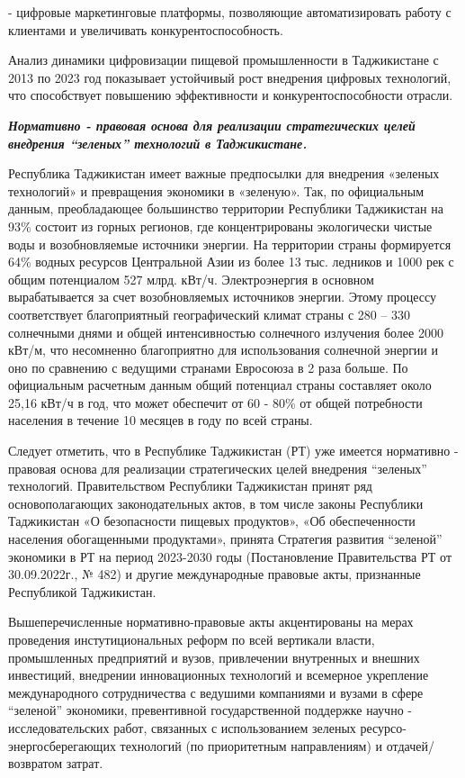 \begin{multicols}{2}
- цифровые маркетинговые платформы, позволяющие автоматизировать работу
с клиентами и увеличивать конкурентоспособность.

Анализ динамики цифровизации пищевой промышленности в Таджикистане с
2013 по 2023 год показывает устойчивый рост внедрения цифровых
технологий, что способствует повышению эффективности и
конкурентоспособности отрасли.

\emph{{\bfseries Нормативно - правовая основа для реализации стратегических
целей внедрения ``зеленых'' технологий в Таджикистане.}}

Республика Таджикистан имеет важные предпосылки для внедрения «зеленых
технологий» и превращения экономики в «зеленую». Так, по официальным
данным, преобладающее большинство территории Республики Таджикистан на
93\% состоит из горных регионов, где концентрированы экологически чистые
воды и возобновляемые источники энергии. На территории страны
формируется 64\% водных ресурсов Центральной Азии из более 13 тыс.
ледников и 1000 рек с общим потенциалом 527 млрд. кВт/ч. Электроэнергия
в основном вырабатывается за счет возобновляемых источников энергии.
Этому процессу соответствует благоприятный географический климат страны
с 280 -- 330 солнечными днями и общей интенсивностью солнечного
излучения более 2000 кВт/м, что несомненно благоприятно для
использования солнечной энергии и оно по сравнению с ведущими странами
Евросоюза в 2 раза больше. По официальным расчетным данным общий
потенциал страны составляет около 25,16 кВт/ч в год, что может обеспечит
от 60 - 80\% от общей потребности населения в течение 10 месяцев в году
по всей страны.

Следует отметить, что в Республике Таджикистан (РТ) уже имеется
нормативно - правовая основа для реализации стратегических целей
внедрения ``зеленых'' технологий. Правительством Республики Таджикистан
принят ряд основополагающих законодательных актов, в том числе законы
Республики Таджикистан «О безопасности пищевых продуктов», «Об
обеспеченности населения обогащенными продуктами», принята Стратегия
развития ``зеленой'' экономики в РТ на период 2023-2030 годы
(Постановление Правительства РТ от 30.09.2022г., № 482) и другие
международные правовые акты, признанные Республикой Таджикистан.

Вышеперечисленные нормативно-правовые акты акцентированы на мерах
проведения инстутициональных реформ по всей вертикали власти,
промышленных предприятий и вузов, привлечении внутренных и внешних
инвестиций, внедрении инновационных технологий и всемерное укрепление
международного сотрудничества с ведушими компаниями и вузами в сфере
``зеленой'' экономики, превентивной государственной поддержке научно -
исследовательских работ, связанных с использованием зеленых
ресурсо-энергосберегающих технологий (по приоритетным направлениям) и
отдачей/возвратом затрат.


\end{multicols}
